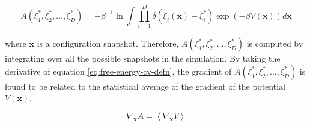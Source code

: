 \begin{spacing}{2.0}
    \begin{equation}
        A(\xi_1^*,\xi_2^*,\ldots,\xi_D^*) = -\beta^{-1}\ln\int\prod_{i=1}^D \delta\left(\xi_i(\mathbf{x}) - \xi_i^*\right)
        \exp\left(-\beta V(\mathbf{x})\right) d\mathbf{x}
        \label{eq:free-energy-cv-defn}
    \end{equation}

    \noindent where $\mathbf{x}$ is a configuration snapshot. Therefore, $A(\xi_1^*,\xi_2^*,\ldots,\xi_D^*)$ is computed by integrating over all 
    the possible snapshots in the simulation. By taking the derivative of equation \ref{eq:free-energy-cv-defn}, the gradient of $A(\xi_1^*,\xi_2^*,\ldots,\xi_D^*)$
    is found to be related to the statistical average of the gradient of the potential $V(\mathbf{x})$,

    \begin{equation}
        \nabla_{\mathbf{x}}A = \left<\nabla_{\mathbf{x}} V\right>
        \label{eq:free-energy-cv-grad-defn}
    \end{equation}


\end{spacing}
